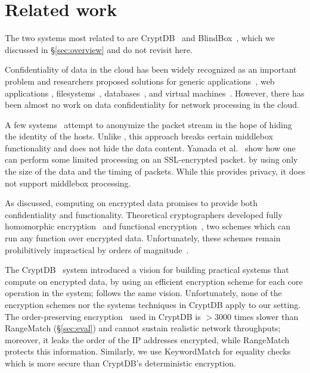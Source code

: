 
\section{Related work}\label{sec:related}
The two systems most related to \sys are CryptDB~\cite{popa:cryptdb} and BlindBox~\cite{blindbox}, which we discussed in \S\ref{sec:overview} and do not revisit here.


Confidentiality of data in the cloud has been widely recognized as an important problem and researchers proposed solutions for generic applications~\cite{Baumann:Haven}, web applications \cite{giffin:hails, Mylar},  filesystems~\cite{blaze:cfs, kallahalla:plutus, goh:sirius},  databases~\cite{popa:cryptdb},  and virtual machines~\cite{Zhang:CloudVisor}. However, there has been almost no work on data confidentiality for network processing in the cloud. 

A few systems~\cite{Vern:Anonymize03, Vern:Anonymize06} attempt to anonymize the packet stream in the hope of hiding the identity of the hosts.
Unlike \sys, this approach breaks certain middlebox functionality and does not hide the data content.
Yamada et al.~\cite{Yamada_IDS} show how one can perform some limited processing on an 
SSL-encrypted packet.
     by using only the size of the data and the timing of packets. While this provides privacy, it does not 
     support middlebox processing. 


As discussed, computing on encrypted data promises to provide both confidentiality and functionality. Theoretical cryptographers developed fully homomorphic encryption~\cite{gentry:fhe, gentry:fhe-aes-eprint} and functional encryption~\cite{BSW11}, two schemes which can run any function over encrypted data. Unfortunately, these schemes remain prohibitively impractical by orders of magnitude~\cite{gentry:fhe-aes-eprint}.

The CryptDB~\cite{popa:cryptdb} system introduced a vision for building practical systems that compute on encrypted data, by using an efficient encryption scheme for each core operation in the system; \sys follows the same  vision. Unfortunately, none of the encryption schemes nor the systems techniques in CryptDB apply to our setting.  The order-preserving encryption~\cite{boldyreva:ope} used in CryptDB is 
 $>3000$ times slower than RangeMatch (\S\ref{sec:eval}) and cannot sustain realistic network throughputs; moreover, it leaks the order of the IP addresses encrypted, while RangeMatch protects this information. Similarly, we use KeywordMatch for equality checks which is more secure than CryptDB's deterministic encryption.%

